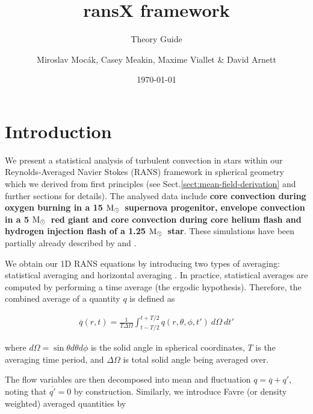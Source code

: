 \documentclass[10pt,paper=a4]{report}
\title{{\bf ransX framework}}
\subtitle{Theory Guide}
\author{
        Miroslav Moc\'ak, Casey Meakin, Maxime Viallet \& David Arnett          
}
\date{\today}
\newcommand{\Msun}{\mbox{M$_\odot$\,}}         %
\newcommand{\eht}{\overline}
\begin{document}

\maketitle

\tableofcontents

\newpage

\section{Introduction}
\label{sect:intro}

\par We present a statistical analysis of turbulent convection in stars within our Reynolds-Averaged Navier Stokes (RANS) framework in spherical geometry which we derived from first principles (see Sect.\ref{sect:mean-field-derivation} and further sections for details). The analysed data include {\bf core convection during oxygen burning in a 15 $\Msun$ supernova progenitor, envelope convection in a 5 $\Msun$ red giant and core convection during core helium flash and hydrogen injection flash of a 1.25 $\Msun$ star}. These simulations have been partially already described by \citet{MeakinArnett2007,ArnettMeakin2010,VialletMeakin2013} and \citet{Mocak2009,Mocak2011}. 

\par We obtain our 1D RANS equations by introducing two types of averaging:  statistical averaging and  horizontal averaging \citep{Besnard1992,VialletMeakin2013}. In practice, statistical averages are computed by performing a time average (the ergodic hypothesis). Therefore, the combined average of a quantity $q$ is defined as

\begin{align}\label{eq:eht}
\eht{q}(r,t) = \frac{1}{T\Delta\Omega}\int_{t- T/2}^{t+T/2} q(r,\theta,\phi,t')~d\Omega~dt'
\end{align}

\noindent where $d \Omega = \sin \theta d \theta d \phi$ is the solid angle in spherical coordinates, $T$ is the averaging time period, and $\Delta\Omega$ is total solid angle being averaged over.

\par The flow variables are then decomposed into mean and fluctuation $q = \eht{q} + q'$, noting that $\eht{q'} = 0$ by construction. Similarly, we introduce Favre (or density weighted) averaged quantities by 
\end{document}
